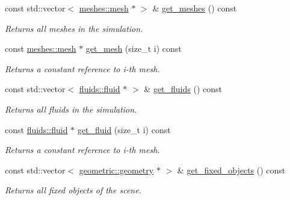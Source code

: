 \begin{DoxyCompactItemize}
const std\+::vector$<$ \hyperlink{classphysim_1_1meshes_1_1mesh}{meshes\+::mesh} $\ast$ $>$ \& \hyperlink{classphysim_1_1simulator_a515217acebf6d4ae784af02a60bede00}{get\+\_\+meshes} () const
\begin{DoxyCompactList}\small\item\em Returns all meshes in the simulation. \end{DoxyCompactList}\item 
\mbox{\label{classphysim_1_1simulator_a04a83acd2135ea5a20c5374cd823224b}} 
const \hyperlink{classphysim_1_1meshes_1_1mesh}{meshes\+::mesh} $\ast$ \hyperlink{classphysim_1_1simulator_a04a83acd2135ea5a20c5374cd823224b}{get\+\_\+mesh} (size\+\_\+t i) const
\begin{DoxyCompactList}\small\item\em Returns a constant reference to i-\/th mesh. \end{DoxyCompactList}\item 
const std\+::vector$<$ \hyperlink{classphysim_1_1fluids_1_1fluid}{fluids\+::fluid} $\ast$ $>$ \& \hyperlink{classphysim_1_1simulator_a65b91f351c9e2164c0e6bd46cdc0a431}{get\+\_\+fluids} () const
\begin{DoxyCompactList}\small\item\em Returns all fluids in the simulation. \end{DoxyCompactList}\item 
\mbox{\label{classphysim_1_1simulator_ad202bd47576d65f838e79c043b5f6075}} 
const \hyperlink{classphysim_1_1fluids_1_1fluid}{fluids\+::fluid} $\ast$ \hyperlink{classphysim_1_1simulator_ad202bd47576d65f838e79c043b5f6075}{get\+\_\+fluid} (size\+\_\+t i) const
\begin{DoxyCompactList}\small\item\em Returns a constant reference to i-\/th mesh. \end{DoxyCompactList}\item 
\mbox{\label{classphysim_1_1simulator_aefd663a9132dd6f500ff0fb8b1c8984a}} 
const std\+::vector$<$ \hyperlink{classphysim_1_1geometric_1_1geometry}{geometric\+::geometry} $\ast$ $>$ \& \hyperlink{classphysim_1_1simulator_aefd663a9132dd6f500ff0fb8b1c8984a}{get\+\_\+fixed\+\_\+objects} () const
\begin{DoxyCompactList}\small\item\em Returns all fixed objects of the scene. \end{DoxyCompactList}\item 

\end{DoxyCompactItemize}
